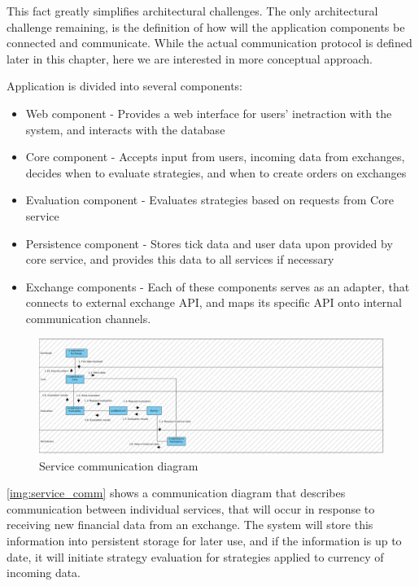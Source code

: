 This fact greatly simplifies architectural challenges. The only architectural challenge remaining, is the definition
of how will the application components be connected and communicate. While the actual communication protocol is
defined later in this chapter, here we are interested in more conceptual approach.

Application is divided into several components:
\begin{itemize}
    \item Web component - Provides a web interface for users' inetraction with the system, and interacts with the database
    \item Core component - Accepts input from users, incoming data from exchanges, decides when to evaluate strategies, and when to create orders on exchanges
    \item Evaluation component - Evaluates strategies based on requests from Core service
    \item Persistence component - Stores tick data and user data upon provided by core service, and provides this data to all services if necessary
    \item Exchange components - Each of these components serves as an adapter, that connects to external exchange API, and
    maps its specific API onto internal communication channels.
\end{itemize}

\begin{figure}[H]
    \includegraphics[width=\textwidth]{obrazky-figures/serv_comm.png}
    \caption{Service communication diagram}
    \label{img:service_comm}
\end{figure}

\autoref{img:service_comm} shows a communication diagram that describes communication between individual services, that
will occur in response to receiving new financial data from an exchange. The system will store this information
into persistent storage for later use, and if the information is up to date, it will initiate strategy evaluation
for strategies applied to currency of incoming data.

